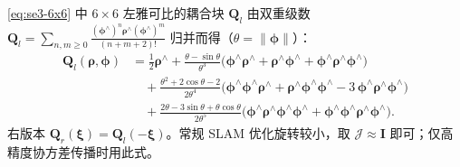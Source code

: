 \begin{derivation}\label{deriv:Ql}
\cref{eq:se3-6x6} 中 $6\times6$ 左雅可比的耦合块 $\mathbf{Q}_l$ 由双重级数 $\mathbf{Q}_l=\sum_{n,m\ge0}\frac{(\boldsymbol{\phi}^\wedge)^n\boldsymbol{\rho}^\wedge(\boldsymbol{\phi}^\wedge)^m}{(n+m+2)!}$ 归并而得（$\theta=\|\boldsymbol{\phi}\|$）：
\begin{align*}
  \mathbf{Q}_l(\boldsymbol{\rho},\boldsymbol{\phi})
  &=\tfrac12\boldsymbol{\rho}^\wedge
   +\frac{\theta-\sin\theta}{\theta^3}\big(\boldsymbol{\phi}^\wedge\boldsymbol{\rho}^\wedge+\boldsymbol{\rho}^\wedge\boldsymbol{\phi}^\wedge+\boldsymbol{\phi}^\wedge\boldsymbol{\rho}^\wedge\boldsymbol{\phi}^\wedge\big)\\
  &\quad+\frac{\theta^2+2\cos\theta-2}{2\theta^4}\big(\boldsymbol{\phi}^\wedge\boldsymbol{\phi}^\wedge\boldsymbol{\rho}^\wedge+\boldsymbol{\rho}^\wedge\boldsymbol{\phi}^\wedge\boldsymbol{\phi}^\wedge-3\,\boldsymbol{\phi}^\wedge\boldsymbol{\rho}^\wedge\boldsymbol{\phi}^\wedge\big)\\
  &\quad+\frac{2\theta-3\sin\theta+\theta\cos\theta}{2\theta^5}\big(\boldsymbol{\phi}^\wedge\boldsymbol{\rho}^\wedge\boldsymbol{\phi}^\wedge\boldsymbol{\phi}^\wedge+\boldsymbol{\phi}^\wedge\boldsymbol{\phi}^\wedge\boldsymbol{\rho}^\wedge\boldsymbol{\phi}^\wedge\big).
\end{align*}
右版本 $\mathbf{Q}_r(\boldsymbol{\xi})=\mathbf{Q}_l(-\boldsymbol{\xi})$。常规 SLAM 优化旋转较小，取 $\boldsymbol{\mathcal{J}}\approx\mathbf{I}$ 即可；仅高精度协方差传播时用此式。
\end{derivation}

